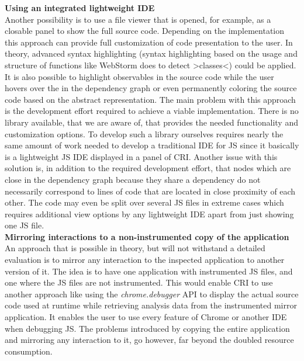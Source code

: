 \textbf{Using an integrated lightweight IDE}\\
Another possibility is to use a file viewer that is opened, for example, as a closable panel to show the full source code. Depending on the implementation this approach can provide full customization of code presentation to the user. In theory, advanced syntax highlighting (syntax highlighting based on the usage and structure of functions like WebStorm does to detect >classes<) could be applied. It is also possible to highlight observables in the source code while the user hovers over the in the dependency graph or even permanently coloring the source code based on the abstract representation. The main problem with this approach is the development effort required to achieve a viable implementation. There is no library available, that we are aware of, that provides the needed functionality and customization options. To develop such a library ourselves requires nearly the same amount of work needed to develop a traditional IDE for JS since it basically is a lightweight JS IDE displayed in a panel of CRI. Another issue with this solution is, in addition to the required development effort, that nodes which are close in the dependency graph because they share a dependency do not necessarily correspond to lines of code that are located in close proximity of each other. The code may even be split over several JS files in extreme cases which requires additional view options by any lightweight IDE apart from just showing one JS file.\\ %
\textbf{Mirroring interactions to a non-instrumented copy of the application}\\
An approach that is possible in theory, but will not withstand a detailed evaluation is to mirror any interaction to the inspected application to another version of it. The idea is to have one application with instrumented JS files, and one where the JS files are not instrumented. This would enable CRI to use another approach like using the \emph{chrome.debugger} API to display the actual source code used at runtime while retrieving analysis data from the instrumented mirror application. It enables the user to use every feature of Chrome or another IDE when debugging JS. The problems introduced by copying the entire application and mirroring any interaction to it, go however, far beyond the doubled resource consumption. %
